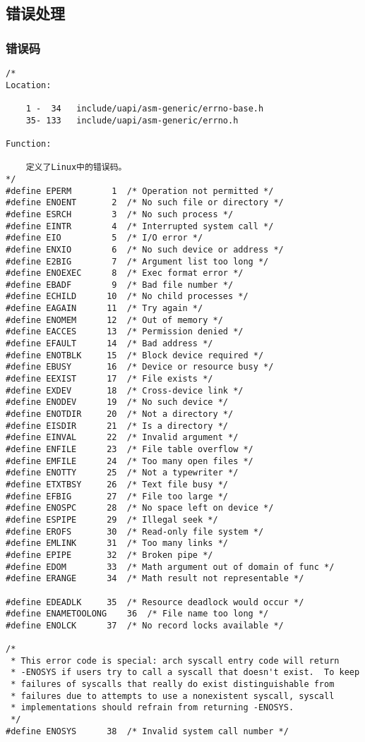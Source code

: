 		\subsection{错误处理}
			\subsubsection{错误码}
\begin{verbatim}
/*
Location:

	1 -  34   include/uapi/asm-generic/errno-base.h
	35- 133	  include/uapi/asm-generic/errno.h

Function:

	定义了Linux中的错误码。
*/
#define	EPERM		 1	/* Operation not permitted */
#define	ENOENT		 2	/* No such file or directory */
#define	ESRCH		 3	/* No such process */
#define	EINTR		 4	/* Interrupted system call */
#define	EIO		 	 5	/* I/O error */
#define	ENXIO		 6	/* No such device or address */
#define	E2BIG		 7	/* Argument list too long */
#define	ENOEXEC		 8	/* Exec format error */
#define	EBADF		 9	/* Bad file number */
#define	ECHILD		10	/* No child processes */
#define	EAGAIN		11	/* Try again */
#define	ENOMEM		12	/* Out of memory */
#define	EACCES		13	/* Permission denied */
#define	EFAULT		14	/* Bad address */
#define	ENOTBLK		15	/* Block device required */
#define	EBUSY		16	/* Device or resource busy */
#define	EEXIST		17	/* File exists */
#define	EXDEV		18	/* Cross-device link */
#define	ENODEV		19	/* No such device */
#define	ENOTDIR		20	/* Not a directory */
#define	EISDIR		21	/* Is a directory */
#define	EINVAL		22	/* Invalid argument */
#define	ENFILE		23	/* File table overflow */
#define	EMFILE		24	/* Too many open files */
#define	ENOTTY		25	/* Not a typewriter */
#define	ETXTBSY		26	/* Text file busy */
#define	EFBIG		27	/* File too large */
#define	ENOSPC		28	/* No space left on device */
#define	ESPIPE		29	/* Illegal seek */
#define	EROFS		30	/* Read-only file system */
#define	EMLINK		31	/* Too many links */
#define	EPIPE		32	/* Broken pipe */
#define	EDOM		33	/* Math argument out of domain of func */
#define	ERANGE		34	/* Math result not representable */

#define	EDEADLK		35	/* Resource deadlock would occur */
#define	ENAMETOOLONG	36	/* File name too long */
#define	ENOLCK		37	/* No record locks available */

/*
 * This error code is special: arch syscall entry code will return
 * -ENOSYS if users try to call a syscall that doesn't exist.  To keep
 * failures of syscalls that really do exist distinguishable from
 * failures due to attempts to use a nonexistent syscall, syscall
 * implementations should refrain from returning -ENOSYS.
 */
#define	ENOSYS		38	/* Invalid system call number */


\end{verbatim}
